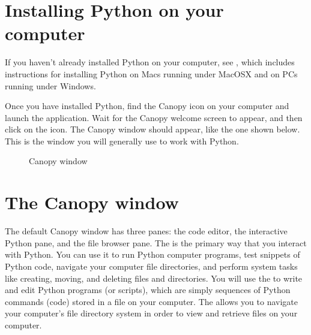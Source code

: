 \documentclass[letterpaper,10pt,english]{sphinxmanual}
\begin{document}
\section{Installing Python on your computer}
\label{\detokenize{chap2/chap2_basics:installing-python-on-your-computer}}
\sphinxAtStartPar
If you haven’t already installed Python on your computer, see {\hyperref[\detokenize{apdx1/apdx1_install:apdx1}]{}}, which includes instructions for installing Python on Macs running under MacOSX and on PCs running under  Windows.

\sphinxAtStartPar
Once you have installed Python, find the Canopy icon on your computer and launch the application.  Wait for the Canopy welcome screen to appear, and then click on the  icon.  The Canopy window should appear, like the one shown below.  This is the window you will generally use to work with Python.

\begin{figure}[htbp]
\centering
\capstart

\noindent{}
\caption{Canopy window}\label{\detokenize{chap2/chap2_basics:id1}}\label{\detokenize{chap2/chap2_basics:fig-canopywindow}}\end{figure}


\section{The Canopy window}
\label{\detokenize{chap2/chap2_basics:the-canopy-window}}
\ignorespaces 
{}\ignorespaces 
\sphinxAtStartPar
The default Canopy window has three panes: the code editor, the interactive Python pane, and the file browser pane.  The  is the primary way that you interact with Python.  You can use it to run Python computer programs, test snippets of Python code, navigate your computer file directories, and perform system tasks like creating, moving, and deleting files and directories.  You will use the  to write and edit Python programs (or scripts), which are simply sequences of Python commands (code) stored in a file on your computer.  The  allows you to navigate your computer’s file directory system in order to view and retrieve files on your computer.
\end{document}
